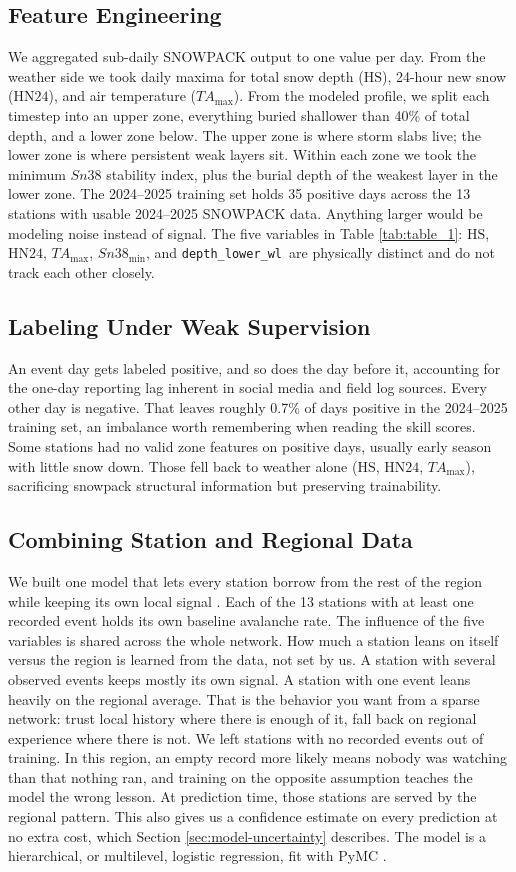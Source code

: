 \documentclass{issw}
\newcommand{\HS}{\mathrm{HS}}
\newcommand{\HNtf}{\mathrm{HN24}}
\newcommand{\TAmax}{TA_{\mathrm{max}}}
\newcommand{\Snmin}{Sn38_{\mathrm{min}}}
\newcommand{\dlwl}{\texttt{depth\_lower\_wl}}
\begin{document}
\subsection{Feature Engineering}
We aggregated sub-daily SNOWPACK output to one value per day. From the weather side we took daily maxima for total snow depth ($\HS$), 24-hour new snow ($\HNtf$), and air temperature ($\TAmax$). From the modeled profile, we split each timestep into an upper zone, everything buried shallower than 40\% of total depth, and a lower zone below. The upper zone is where storm slabs live; the lower zone is where persistent weak layers sit. Within each zone we took the minimum ${Sn38}$ stability index, plus the burial depth of the weakest layer in the lower zone.
The 2024–2025 training set holds 35 positive days across the 13 stations with usable 2024–2025 SNOWPACK data. Anything larger would be modeling noise instead of signal. The five variables in Table \ref{tab:table_1}: $\HS$, $\HNtf$, $\TAmax$, $\Snmin$, and \dlwl\ are physically distinct and do not track each other closely.

\subsection{Labeling Under Weak Supervision}
An event day gets labeled positive, and so does the day before it, accounting for the one-day reporting lag inherent in social media and field log sources. Every other day is negative. That leaves roughly 0.7\% of days positive in the 2024–2025 training set, an imbalance worth remembering when reading the skill scores.
Some stations had no valid zone features on positive days, usually early season with little snow down. Those fell back to weather alone ($\HS$, $\HNtf$, $\TAmax$), sacrificing snowpack structural information but preserving trainability.

\subsection{Combining Station and Regional Data}
We built one model that lets every station borrow from the rest of the region while keeping its own local signal \parencite{GelmanHill2007}. Each of the 13 stations with at least one recorded event holds its own baseline avalanche rate. The influence of the five variables is shared across the whole network.
How much a station leans on itself versus the region is learned from the data, not set by us. A station with several observed events keeps mostly its own signal. A station with one event leans heavily on the regional average. That is the behavior you want from a sparse network: trust local history where there is enough of it, fall back on regional experience where there is not.
We left stations with no recorded events out of training. In this region, an empty record more likely means nobody was watching than that nothing ran, and training on the opposite assumption teaches the model the wrong lesson. At prediction time, those stations are served by the regional pattern.
This also gives us a confidence estimate on every prediction at no extra cost, which Section \ref{sec:model-uncertainty} describes. The model is a hierarchical, or multilevel, logistic regression, fit with PyMC \parencite{AbrilPla2023}.
\end{document}

